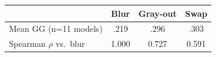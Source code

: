 \begin{tabular}{@{}lccc@{}}
\toprule
 & Blur & Gray-out & Swap \\
\midrule
Mean GG (n=11 models) & .219 & .296 & .303 \\
Spearman $\rho$ vs.\ blur & 1.000 & 0.727 & 0.591 \\
\bottomrule
\end{tabular}